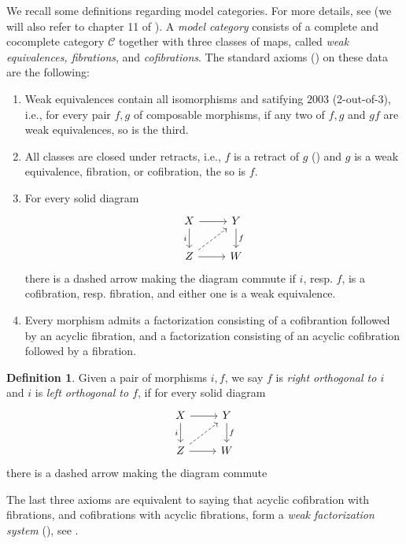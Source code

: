 \documentclass[a4paper]{book}
\newcommand{\lC}{\mathcal{C}}
\theoremstyle{definition}
\newtheorem{definition}[equation]{Definition}
\theoremstyle{remark}
\numberwithin{equation}{section}
\begin{document}
We recall some definitions regarding model categories. For more details, see \cite{hirschhorn2003modelcategories} (we will also refer to chapter 11 of \cite{riehl2014categoricalhomotopytheory}). A \emph{model category} consists of a complete and cocomplete category $\lC$ together with three classes of maps, called \emph{weak equivalences, fibrations}, and \emph{cofibrations}. The standard axioms (\cite[Definition 7.1.3]{hirschhorn2003modelcategories}) on these data are the following:  
\begin{enumerate}
	\item Weak equivalences contain all isomorphisms and satifying $2003$ (2-out-of-3), i.e., for every pair $f,g$ of composable morphisms, if any two of $f,g$ and $gf$ are weak equivalences, so is the third.
	\item All classes are closed under retracts, i.e., $f$ is a retract of $g$ (\cite[Definition 7.1.1]{hirschhorn2003modelcategories}) and $g$ is a weak equivalence, fibration, or cofibration, the so is $f$.
	\item For every solid diagram \begin{equation}\label{diag:lifting}
    \begin{tikzcd}
      X \arrow[d,"i"']\arrow[r] & Y\arrow[d,"f"]  \\
      Z\arrow[ru,dashed]\arrow[r] & W
    \end{tikzcd}
  \end{equation}there is a dashed arrow making the diagram commute if $i$, resp. $f$, is a cofibration, resp. fibration, and either one is a weak equivalence. 
  \item Every morphism admits a factorization consisting of a cofibrantion followed by an acyclic fibration, and a factorization consisting of an acyclic cofibration followed by a fibration. 
\end{enumerate}
\begin{definition}
	Given a pair of morphisms $i,f$, we say $f$ is \emph{right orthogonal to $i$} and $i$ is \emph{left orthogonal to $f$}, if for every solid diagram \begin{equation}
    \begin{tikzcd}
      X \arrow[d,"i"']\arrow[r] & Y\arrow[d,"f"]  \\
      Z\arrow[ru,dashed]\arrow[r] & W
    \end{tikzcd}
  \end{equation}there is a dashed arrow making the diagram commute
\end{definition}
The last three axioms are equivalent to saying that acyclic cofibration with fibrations, and cofibrations with acyclic fibrations, form a \emph{weak factorization system} (\cite[Definition 11.2.1]{riehl2014categoricalhomotopytheory}), see \cite[\S 11.3]{riehl2014categoricalhomotopytheory}. 
\end{document}
